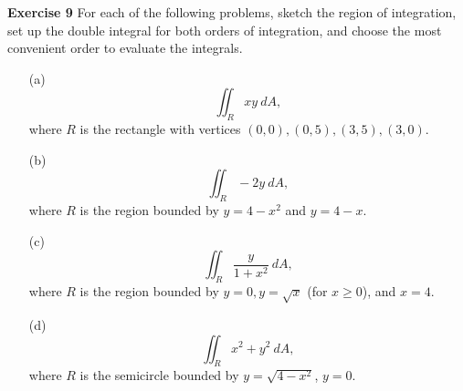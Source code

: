 \documentclass[12pt,oneside]{exam}
\newenvironment{exercise}[1]{\vspace{.1in}\noindent\textbf{Exercise #1 \hspace{.05em}}}{}
\begin{document}
\begin{exercise}{9}
For each of the following problems, sketch the region of integration, set up the double integral for both orders of integration, and choose the most convenient order to evaluate the integrals.

\begin{itemize}
\item[(a)]
\begin{equation*}
\iint_{R} xy \ dA,
\end{equation*}
where $R$ is the rectangle with vertices $(0,0), (0,5), (3,5), (3,0)$. 
\item[(b)]
\begin{equation*}
\iint_{R} -2y\  dA,
\end{equation*}
where $R$ is the region bounded by $y=4-x^2$ and $y=4-x$. 
\item[(c)]
\begin{equation*}
\iint_{R} \frac{y}{1+x^2}\  dA,
\end{equation*}
where $R$ is the region bounded by $y=0, y=\sqrt{x}$ (for $x \geq 0$), and $x=4$. 
\item[(d)]
\begin{equation*}
\iint_{R} x^2+y^2 \ dA,
\end{equation*}
where $R$ is the semicircle bounded by $y=\sqrt{4-x^2}$, $y=0$. 
\end{itemize}
\end{exercise}
\end{document}
